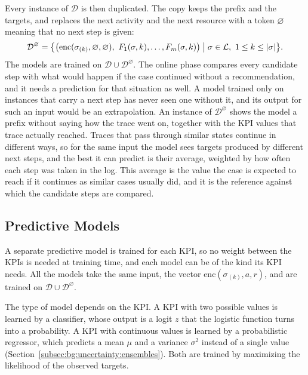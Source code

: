Every instance of $\mathcal{D}$ is then duplicated. The copy keeps the
prefix and the targets, and replaces the next activity and the next resource
with a token $\varnothing$ meaning that no next step is given:
\begin{equation}
  \mathcal{D}^{\varnothing} = \bigl\{ \bigl( \mathrm{enc}(\sigma_{(k)},
  \varnothing, \varnothing),\ F_1(\sigma, k), \dots, F_m(\sigma, k) \bigr)
  \bigm| \sigma \in \mathcal{L},\ 1 \le k \le |\sigma| \bigr\}.
  \label{eq:met:off:baselineset}
\end{equation}
The models are trained on $\mathcal{D} \cup \mathcal{D}^{\varnothing}$. The
online phase compares every candidate step with what would happen if the
case continued without a recommendation, and it needs a prediction for that
situation as well. A model trained only on instances that carry a next step
has never seen one without it, and its output for such an input would be an
extrapolation. An instance of $\mathcal{D}^{\varnothing}$ shows the
model a prefix without saying how the trace went on, together with the KPI
values that trace actually reached. Traces that pass through similar states
continue in different ways, so for the same input the model sees targets
produced by different next steps, and the best it can predict is their
average, weighted by how often each step was taken in the log. This average
is the value the case is expected to reach if it continues as similar cases
usually did, and it is the reference against which the candidate steps are
compared.


\subsection{Predictive Models}
\label{subsec:met:offline:models}
A separate predictive model is trained for each KPI, so no weight between
the KPIs is needed at training time, and each model can be of the kind its
KPI needs.
All the models take the same input, the vector
$\mathrm{enc}(\sigma_{(k)}, a, r)$, and are trained on
$\mathcal{D} \cup \mathcal{D}^{\varnothing}$.

The type of model depends on the KPI. A KPI with two possible values is
learned by a classifier, whose output is a logit $z$ that the logistic
function turns into a probability. A KPI with continuous values is learned
by a probabilistic regressor, which predicts a mean $\mu$ and a variance
$\sigma^{2}$ instead of a single value
(Section~\ref{subsec:bg:uncertainty:ensembles}). Both are trained by
maximizing the likelihood of the observed targets.

